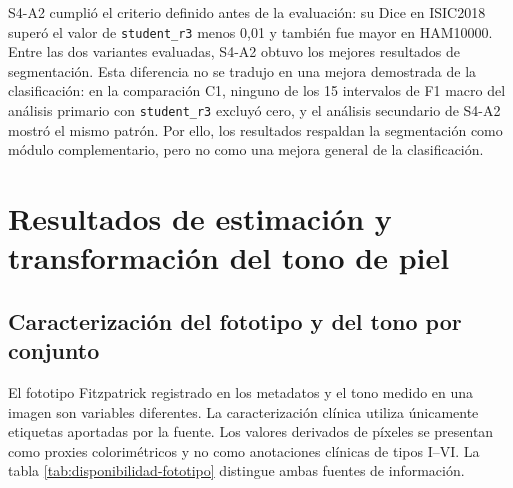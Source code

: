 \FloatBarrier

S4-A2 cumplió el criterio definido antes de la evaluación: su Dice en ISIC2018 superó el valor de \texttt{student\_r3} menos 0,01 y también fue mayor en HAM10000. Entre las dos variantes evaluadas, S4-A2 obtuvo los mejores resultados de segmentación. Esta diferencia no se tradujo en una mejora demostrada de la clasificación: en la comparación C1, ninguno de los 15 intervalos de F1 macro del análisis primario con \texttt{student\_r3} excluyó cero, y el análisis secundario de S4-A2 mostró el mismo patrón. Por ello, los resultados respaldan la segmentación como módulo complementario, pero no como una mejora general de la clasificación.

\section{Resultados de estimación y transformación del tono de piel}\label{sec:resultados-tono}

\subsection{Caracterización del fototipo y del tono por conjunto}
\label{sec:caracterizacion-tono}

El fototipo Fitzpatrick registrado en los metadatos y el tono medido en una imagen son variables diferentes. La caracterización clínica utiliza únicamente etiquetas aportadas por la fuente. Los valores derivados de píxeles se presentan como proxies colorimétricos y no como anotaciones clínicas de tipos I--VI. La tabla \ref{tab:disponibilidad-fototipo} distingue ambas fuentes de información.

